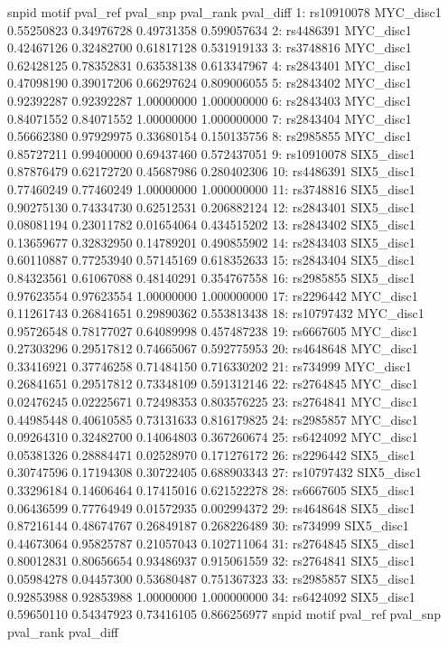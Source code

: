 \documentclass[a4paper,10pt]{article}
\begin{document}
\begin{Schunk}
\begin{Soutput}
         snpid      motif   pval_ref   pval_snp  pval_rank   pval_diff
 1: rs10910078  MYC_disc1 0.55250823 0.34976728 0.49731358 0.599057634
 2:  rs4486391  MYC_disc1 0.42467126 0.32482700 0.61817128 0.531919133
 3:  rs3748816  MYC_disc1 0.62428125 0.78352831 0.63538138 0.613347967
 4:  rs2843401  MYC_disc1 0.47098190 0.39017206 0.66297624 0.809006055
 5:  rs2843402  MYC_disc1 0.92392287 0.92392287 1.00000000 1.000000000
 6:  rs2843403  MYC_disc1 0.84071552 0.84071552 1.00000000 1.000000000
 7:  rs2843404  MYC_disc1 0.56662380 0.97929975 0.33680154 0.150135756
 8:  rs2985855  MYC_disc1 0.85727211 0.99400000 0.69437460 0.572437051
 9: rs10910078 SIX5_disc1 0.87876479 0.62172720 0.45687986 0.280402306
10:  rs4486391 SIX5_disc1 0.77460249 0.77460249 1.00000000 1.000000000
11:  rs3748816 SIX5_disc1 0.90275130 0.74334730 0.62512531 0.206882124
12:  rs2843401 SIX5_disc1 0.08081194 0.23011782 0.01654064 0.434515202
13:  rs2843402 SIX5_disc1 0.13659677 0.32832950 0.14789201 0.490855902
14:  rs2843403 SIX5_disc1 0.60110887 0.77253940 0.57145169 0.618352633
15:  rs2843404 SIX5_disc1 0.84323561 0.61067088 0.48140291 0.354767558
16:  rs2985855 SIX5_disc1 0.97623554 0.97623554 1.00000000 1.000000000
17:  rs2296442  MYC_disc1 0.11261743 0.26841651 0.29890362 0.553813438
18: rs10797432  MYC_disc1 0.95726548 0.78177027 0.64089998 0.457487238
19:  rs6667605  MYC_disc1 0.27303296 0.29517812 0.74665067 0.592775953
20:  rs4648648  MYC_disc1 0.33416921 0.37746258 0.71484150 0.716330202
21:   rs734999  MYC_disc1 0.26841651 0.29517812 0.73348109 0.591312146
22:  rs2764845  MYC_disc1 0.02476245 0.02225671 0.72498353 0.803576225
23:  rs2764841  MYC_disc1 0.44985448 0.40610585 0.73131633 0.816179825
24:  rs2985857  MYC_disc1 0.09264310 0.32482700 0.14064803 0.367260674
25:  rs6424092  MYC_disc1 0.05381326 0.28884471 0.02528970 0.171276172
26:  rs2296442 SIX5_disc1 0.30747596 0.17194308 0.30722405 0.688903343
27: rs10797432 SIX5_disc1 0.33296184 0.14606464 0.17415016 0.621522278
28:  rs6667605 SIX5_disc1 0.06436599 0.77764949 0.01572935 0.002994372
29:  rs4648648 SIX5_disc1 0.87216144 0.48674767 0.26849187 0.268226489
30:   rs734999 SIX5_disc1 0.44673064 0.95825787 0.21057043 0.102711064
31:  rs2764845 SIX5_disc1 0.80012831 0.80656654 0.93486937 0.915061559
32:  rs2764841 SIX5_disc1 0.05984278 0.04457300 0.53680487 0.751367323
33:  rs2985857 SIX5_disc1 0.92853988 0.92853988 1.00000000 1.000000000
34:  rs6424092 SIX5_disc1 0.59650110 0.54347923 0.73416105 0.866256977
         snpid      motif   pval_ref   pval_snp  pval_rank   pval_diff
\end{Soutput}
\end{Schunk}
\end{document}
